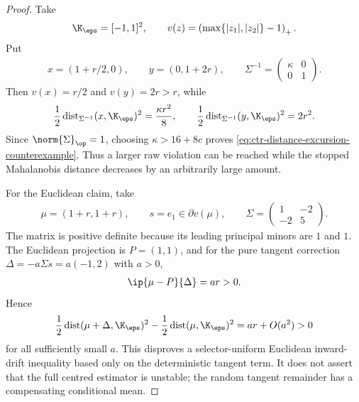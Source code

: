 \begin{proof}
    Take
    \begin{align}
        \K_\eps=[-1,1]^2,
        \qquad
        v(z)=\left(\max\{|z_1|,|z_2|\}-1\right)_+.
    \end{align}
    Put
    \begin{align}
        x=(1+r/2,0),
        \qquad
        y=(0,1+2r),
        \qquad
        \Sigma^{-1}=
        \begin{pmatrix}
            \kappa & 0 \\
            0      & 1
        \end{pmatrix}.
    \end{align}
    Then $v(x)=r/2$ and $v(y)=2r>r$, while
    \begin{align}
        \frac12\operatorname{dist}_{\Sigma^{-1}}(x,\K_\eps)^2
        =\frac{\kappa r^2}{8},
        \qquad
        \frac12\operatorname{dist}_{\Sigma^{-1}}(y,\K_\eps)^2
        =2r^2.
    \end{align}
    Since $\norm{\Sigma}_{\op}=1$, choosing
    $\kappa>16+8c$ proves
    \eqref{eq:ctr-distance-excursion-counterexample}.  Thus a larger raw
    violation can be reached while the stopped Mahalanobis distance decreases
    by an arbitrarily large amount.

    For the Euclidean claim, take
    \begin{align}
        \mu=(1+r,1+r),
        \qquad
        s=e_1\in\partial v(\mu),
        \qquad
        \Sigma=
        \begin{pmatrix}
            1  & -2 \\
            -2 & 5
        \end{pmatrix}.
    \end{align}
    The matrix is positive definite because its leading principal minors are
    $1$ and $1$.  The Euclidean projection is $P=(1,1)$, and for the pure
    tangent correction $\Delta=-a\Sigma s=a(-1,2)$ with $a>0$,
    \begin{align}
        \ip{\mu-P}{\Delta}=ar>0.
    \end{align}
    Hence
    \begin{align}
        \frac12\operatorname{dist}(\mu+\Delta,\K_\eps)^2
        -\frac12\operatorname{dist}(\mu,\K_\eps)^2
        =ar+O(a^2)>0
    \end{align}
    for all sufficiently small $a$.  This disproves a selector-uniform
    Euclidean inward-drift inequality based only on the deterministic tangent
    term.  It does not assert that the full centred estimator is unstable; the
    random tangent remainder has a compensating conditional mean.
\end{proof}

